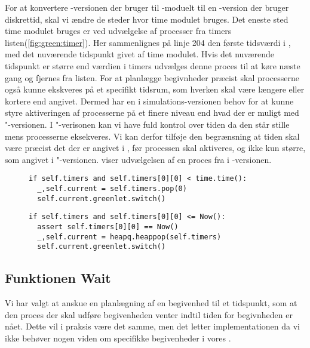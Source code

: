For at konvertere -versionen der bruger til -moduelt til en -version der bruger diskrettid, skal vi ændre de steder hvor time modulet bruges. Det eneste sted time modulet bruges er ved udvælgelse af processer fra timers listen(\cref{fig:green:timer}). 
Her sammenlignes på linje 204 den første tidsværdi i , med det nuværende tidspunkt givet af time modulet.
Hvis det nuværende tidspunkt er større end værdien i timers udvælges denne proces til at køre næste gang og fjernes fra listen.
For at planlægge begivnheder præcist skal processerne også kunne ekskveres på et specifikt tidsrum, som hverken skal være længere eller kortere end angivet. Dermed har  \sched en i simulations-versionen behov for at kunne  styre aktiveringen af processerne på et finere niveau end hvad der er muligt med "-versionen.  
I "-verisonen kan vi have fuld kontrol over tiden da  den står stille mens processerne eksekveres.
Vi kan derfor tilføje den begrænsning at tiden skal være præcist det der er angivet i , før processen skal aktiveres, og ikke kun større, som angivet i "-versionen.  viser udvælgelsen af en proces fra  i -versionen. 

\begin{figure}[hbtp]
\begin{minipage}[c]{\linewidth}
\begin{lstlisting}[firstnumber=204, label=fig:green:timer, caption=Udvælgelse af proces fra listen timers (fra scheduling.py)]
if self.timers and self.timers[0][0] < time.time():
  _,self.current = self.timers.pop(0)
  self.current.greenlet.switch()
\end{lstlisting}
\end{minipage}
\begin{minipage}[c]{\linewidth}
\begin{lstlisting}[firstnumber=124, label=fig:sim:timer, caption=Udvælgelse af proces fra listen timers (fra simulation.py)]
if self.timers and self.timers[0][0] <= Now():
  assert self.timers[0][0] == Now()
  _,self.current = heapq.heappop(self.timers)
  self.current.greenlet.switch()
\end{lstlisting}
\end{minipage}
\end{figure}


\subsection{Funktionen Wait}\label{sec:Wait}
Vi har valgt at anskue en planlægning af en begivenhed til et tidspunkt, som at den proces der skal udføre begivenheden venter indtil tiden for begivnheden er nået. Dette vil i praksis være det samme, men det letter implementationen da vi ikke behøver nogen viden om specifikke begivenheder i vores \sched. 

